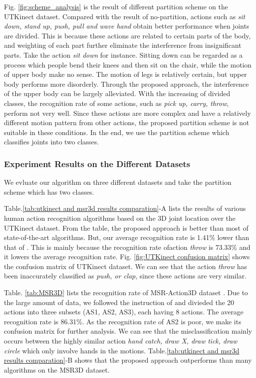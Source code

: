 \documentclass[conference]{IEEEtran}
\begin{document}
			Fig. \ref{fig:scheme_analysis} is the result of different partition scheme on the UTKinect dataset.
			Compared with the result of no-partition, actions such as \textit{sit down, stand up, push, pull and wave hand} obtain better performance when joints are divided.
			This is because these actions are	 related to certain parts of the body, and weighting of each part further eliminate the interference from insignificant parts.
			Take the action \textit{sit down} for instance.
			Sitting down can be regarded as a process which people bend their knees and then sit on the chair, while the motion of upper body make no sense.
			The motion of legs is relatively certain, but upper body performs more disorderly.
			Through the proposed approach, the interference of the upper body can be largely alleviated.
			With the increasing of divided classes, the recognition rate of some actions, such as \textit{pick up, carry, throw}, perform not very well.
			Since these actions are more complex and have a relatively different motion pattern from other actions, the proposed partition scheme is not suitable in these conditions.
			In the end, we use the partition scheme which classifies joints into two classes.
			
		\subsubsection{Experiment Results on the Different Datasets}
			We evluate our algorithm on three different datasets and take the partition scheme which has two classes.
			
			Table.\ref{tab:utkinect and msr3d results comparation}-A lists the results of various human action recognition algorithms based on the 3D joint location over the UTKinect dataset.
			From the table, the proposed approach is better than most of state-of-the-art algorithms.
			But, our average recognition rate is 1.41\% lower than that of \cite{lie_group}.
			This is mainly because the recognition rate ofaction \textit{throw} is 73.33\% and it lowers the average recognition rate.
			Fig. \ref{fig:UTKinect confusion matrix} shows the confusion matrix of UTKinect dataset.
			We can see that the action \textit{throw} has been inaccurately classified as \textit{push, or clap}, since these actions are very similar.

			Table. \ref{tab:MSR3D} lists the recognition rate of MSR-Action3D dataset \cite{MSR3D_dataset}.
			Due to the large amount of data, we followed the instruction of \cite{MSR3D_dataset} and divieded the 20 actions into three subsets (AS1, AS2, AS3), each having 8 actions.
			The average recognition rate is 86.31\%.
			As the recognition rate of AS2 is poor, we make its confusion matrix for further analysis.
			We can see that the misclassification mainly occurs between the highly similar action \textit{hand catch, draw X, draw tick, draw circle} which only involve hands in the motions.
			Table.\ref{tab:utkinect and msr3d results comparation}-B shows that the proposed approach outperforms than many algorithms on the MSR3D dataset.
			
\end{document}
